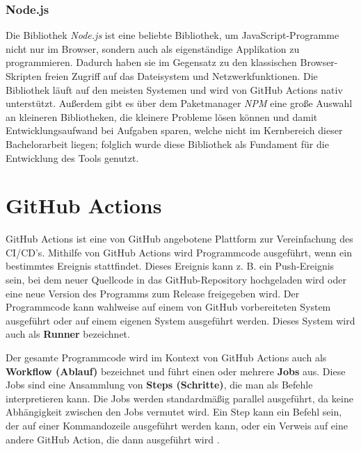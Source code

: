 \subsubsection{Node.js}
Die Bibliothek  \textit{Node.js} ist eine beliebte Bibliothek, um JavaScript-Programme nicht nur im Browser, sondern auch als eigenständige Applikation zu programmieren. Dadurch haben sie im Gegensatz zu den klassischen Browser-Skripten freien Zugriff auf das Dateisystem und Netzwerkfunktionen.  Die Bibliothek läuft auf den meisten Systemen und  wird von GitHub Actions nativ unterstützt. Außerdem gibt es über dem Paketmanager \textit{NPM} eine große Auswahl an kleineren Bibliotheken, die kleinere Probleme lösen können und damit Entwicklungsaufwand bei Aufgaben sparen, welche nicht im Kernbereich dieser Bachelorarbeit liegen; folglich wurde diese Bibliothek als Fundament für die Entwicklung des Tools genutzt. 

\section{GitHub Actions}\label{chapter:github_actions}

GitHub Actions \cite{GithubActions} ist eine von GitHub angebotene Plattform zur Vereinfachung des \ac{CI/CD}'s. Mithilfe von  GitHub Actions wird Programmcode ausgeführt, wenn ein bestimmtes Ereignis stattfindet. Dieses Ereignis kann z. B. ein Push-Ereignis sein, bei dem neuer Quellcode in das GitHub-Repository hochgeladen wird oder eine neue Version des Programms zum Release freigegeben wird. Der Programmcode kann wahlweise auf einem von  GitHub vorbereiteten System ausgeführt oder auf einem eigenen System ausgeführt werden. Dieses System wird auch als \textbf{Runner} bezeichnet.

Der gesamte Programmcode wird im Kontext von GitHub Actions auch als \textbf{Workflow (Ablauf)} bezeichnet und führt einen oder mehrere \textbf{Jobs} aus. Diese Jobs sind eine Ansammlung von \textbf{Steps (Schritte)}, die man als Befehle interpretieren kann. Die Jobs werden standardmäßig parallel ausgeführt, da keine Abhängigkeit zwischen den Jobs vermutet wird. Ein Step kann ein Befehl sein, der auf einer Kommandozeile ausgeführt werden kann, oder ein Verweis auf eine andere GitHub Action, die dann ausgeführt wird \cite[S. 5-7]{github_action_book}. 


